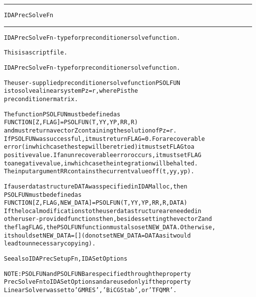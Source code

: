 \begin{samepage}
\hrule
\begin{center}
{\large \verb!IDAPrecSolveFn!}
\label{p:IDAPrecSolveFn}
\end{center}
\hrule\vspace{0.1in}



\begin{alltt}
IDAPrecSolveFn - type for preconditioner solve function.
\end{alltt}

\end{samepage}



\begin{samepage}


\begin{alltt}
This is a script file. 
\end{alltt}

\end{samepage}



\begin{alltt}
IDAPrecSolveFn - type for preconditioner solve function.

   The user-supplied preconditioner solve function PSOLFUN
   is to solve a linear system P z = r, where P is the
   preconditioner matrix.

   The function PSOLFUN must be defined as 
        FUNCTION [Z, FLAG] = PSOLFUN(T,YY,YP,RR,R)
   and must return a vector Z containing the solution of Pz=r.
   If PSOLFUN was successful, it must return FLAG=0. For a recoverable 
   error (in which case the step will be retried) it must set FLAG to a 
   positive value. If an unrecoverable error occurs, it must set FLAG
   to a negative value, in which case the integration will be halted.
   The input argument RR contains the current value of f(t,yy,yp).

   If a user data structure DATA was specified in IDAMalloc, then
   PSOLFUN must be defined as
        FUNCTION [Z, FLAG, NEW_DATA] = PSOLFUN(T,YY,YP,RR,R,DATA)
   If the local modifications to the user data structure are needed in
   other user-provided functions then, besides setting the vector Z and
   the flag FLAG, the PSOLFUN function must also set NEW_DATA. Otherwise,
   it should set NEW_DATA=[] (do not set NEW_DATA = DATA as it would
   lead to unnecessary copying).

   See also IDAPrecSetupFn, IDASetOptions

   NOTE: PSOLFUN and PSOLFUNB are specified through the property
   PrecSolveFn to IDASetOptions and are used only if the property
   LinearSolver was set to 'GMRES', 'BiCGStab', or 'TFQMR'.
\end{alltt}






\vspace{0.1in}
